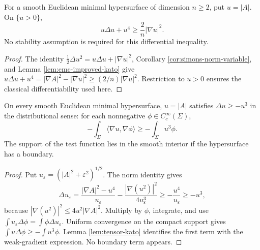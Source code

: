 \begin{proposition}\label{prop:minimal-simons-inequality}
For a smooth Euclidean minimal hypersurface of dimension $n\geq2$, put $u=|A|$. On $\{u>0\}$,
\[
 u\Delta u+u^4\geq\frac2n|\nabla u|^2.
\]
No stability assumption is required for this differential inequality.
\end{proposition}
\begin{proof}
The identity $\frac12\Delta u^2=u\Delta u+|\nabla u|^2$, Corollary \ref{cor:simons-norm-variable}, and Lemma \ref{lem:cmc-improved-kato} give
$u\Delta u+u^4=|\nabla A|^2-|\nabla u|^2\geq(2/n)|\nabla u|^2$. Restriction to $u>0$ ensures the classical differentiability used here.
\end{proof}

\begin{proposition}\label{prop:weak-curvature-subsolution}
On every smooth Euclidean minimal hypersurface, $u=|A|$ satisfies $\Delta u\geq-u^3$ in the distributional sense: for each nonnegative $\phi\in C_c^\infty(\Sigma)$,
\[
 -\int_\Sigma\langle\nabla u,\nabla\phi\rangle\geq-\int_\Sigma u^3\phi.
\]
The support of the test function lies in the smooth interior if the hypersurface has a boundary.
\end{proposition}
\begin{proof}
Put $u_\varepsilon=(|A|^2+\varepsilon^2)^{1/2}$. The norm identity gives
\[
 \Delta u_\varepsilon
 =\frac{|\nabla A|^2-u^4}{u_\varepsilon}
   -\frac{|\nabla(u^2)|^2}{4u_\varepsilon^3}
 \geq-\frac{u^4}{u_\varepsilon}\geq-u^3,
\]
because $|\nabla(u^2)|^2\leq4u^2|\nabla A|^2$. Multiply by $\phi$, integrate, and use $\int u_\varepsilon\Delta\phi=\int\phi\Delta u_\varepsilon$. Uniform convergence on the compact support gives $\int u\Delta\phi\geq-\int u^3\phi$. Lemma \ref{lem:tensor-kato} identifies the first term with the weak-gradient expression. No boundary term appears.
\end{proof}

